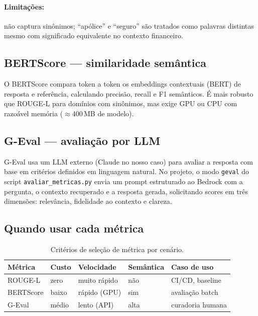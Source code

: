 \paragraph{Limita\c{c}\~oes:} n\~ao captura sin\^onimos; ``ap\'olice''
e ``seguro'' s\~ao tratados como palavras distintas mesmo com
significado equivalente no contexto financeiro.

\subsection{BERTScore --- similaridade sem\^antica}

O BERTScore compara token a token os embeddings
contextuais (BERT) de resposta e refer\^encia, calculando
precis\~ao, recall e F1 sem\^anticos. \'E mais robusto que ROUGE-L
para dom\'inios com sin\^onimos, mas exige GPU ou CPU com
razo\'avel mem\'oria ($\approx$400\,MB de modelo).

\subsection{G-Eval --- avalia\c{c}\~ao por LLM}

G-Eval usa um LLM externo (Claude no nosso caso)
para avaliar a resposta com base em crit\'erios definidos em
linguagem natural. No projeto, o modo \texttt{geval} do script
\texttt{avaliar\_metricas.py} envia um prompt estruturado ao
Bedrock com a pergunta, o contexto recuperado e a resposta gerada,
solicitando scores em tr\^es dimens\~oes: relev\^ancia, fidelidade
ao contexto e clareza.

\subsection{Quando usar cada m\'etrica}

\begin{table}[htbp]
\centering
\caption{Crit\'erios de sele\c{c}\~ao de m\'etrica por cen\'ario.}
\label{tab:metricas_cenarios}
\begin{tabular}{lllll}
\toprule
\textbf{M\'etrica} & \textbf{Custo} & \textbf{Velocidade}
  & \textbf{Sem\^antica} & \textbf{Caso de uso} \\
\midrule
ROUGE-L   & zero   & muito r\'apido & n\~ao & CI/CD, baseline \\
BERTScore & baixo  & r\'apido (GPU) & sim  & avalia\c{c}\~ao batch \\
G-Eval    & m\'edio & lento (API)   & alta & curadoria humana \\
\bottomrule
\end{tabular}
\end{table}

